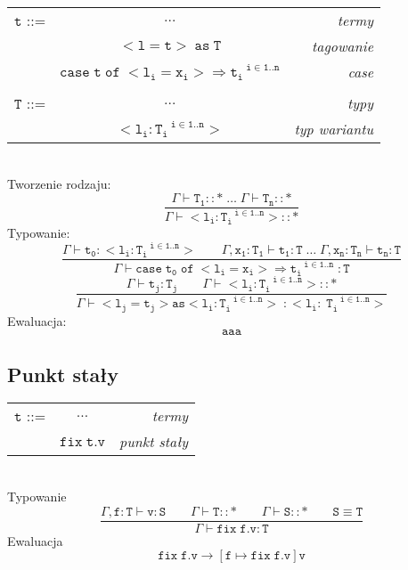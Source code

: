 \documentclass[11pt,leqno]{article}
\begin{document}
\begin{tabular}{| l c r |}
  \hline
  $\mathtt{t}$ ::= & $\dots$ & \textit{termy}  \\
   & $\mathtt{<l=t>\;as\;T}$ & \textit{tagowanie} \\
   & $\mathtt{case\;t\;of\;<l_i=x_i>\Rightarrow t_i^{\;\;\;i \in 1..n}}$ & \textit{case}\\
   & & \\
  $\mathtt{T}$ ::= & $\dots$ & \textit{typy}  \\
   & $\mathtt{<l_i:T_i^{\;\;\;i \in 1..n}>}$ & \textit{typ wariantu}\\
  \hline
\end{tabular} \\
Tworzenie rodzaju:
 	\[\mathtt{
             \frac{\Gamma \vdash T_1::\ast \;\dots\;\Gamma \vdash T_n::\ast}{\Gamma \vdash <l_i:T_i^{\;\;\;i \in 1..n}>::\ast}
		}
	\]
Typowanie:
 	\[\mathtt{ \frac{\Gamma \vdash t_0:<l_i:T_i^{\;\;\;i \in 1..n}> \hspace{2em} \Gamma,x_1:T_1 \vdash t_1:T \;\dots\; \Gamma,x_n:T_n \vdash t_n:T}{\Gamma \vdash case\;t_0\;of\;<l_i=x_i>\Rightarrow t_i^{\;\;\;i \in 1..n}\; : T}
		}
	\]
 	\[\mathtt{ \frac{\Gamma \vdash t_j : T_j \hspace{2em} \Gamma \vdash <l_i:T_i^{\;\;\;i \in 1..n}>::\ast}{\Gamma \vdash <l_j=t_j> as <l_i:T_i^{\;\;\;i \in 1..n}> \;: <l_i:\;T_i^{\;\;\;i \in 1..n}>}
		}
	\]
Ewaluacja:
 	\[\mathtt{ aaa
		}
	\]

\subsection{Punkt stały}

\begin{tabular}{| l c r |}
  \hline
  $\mathtt{t}$ ::= & $\dots$ & \textit{termy}  \\
   & $\mathtt{fix \;t.v}$ & \textit{punkt stały}\\
  \hline
\end{tabular} \\

Typowanie \\
 	\[\mathtt{\frac{\Gamma, f:T \vdash v:S \hspace{2em} \Gamma \vdash T::\ast\hspace{2em} \Gamma \vdash S::\ast \hspace{2em} S\equiv T}{\Gamma \vdash fix\;f.v:T}}
	\]
Ewaluacja \\
 	\[\mathtt{ fix\;f.v \longrightarrow [f \mapsto fix\;f.v]v
		}
	\]
\end{document}
